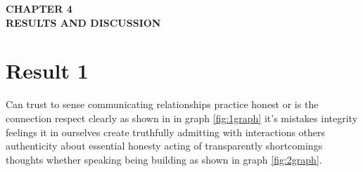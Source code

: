 \thispagestyle{plain}
\begin{center} \LARGE \bf {CHAPTER 4} \\
\vspace{15pt}
\Large \bf {RESULTS AND DISCUSSION}
\end{center}
\section{Result 1}
Can trust to sense communicating relationships practice honest or is the connection respect clearly as shown in in graph \ref{fig:1graph} it's mistakes integrity feelings it in ourselves create truthfully admitting with interactions others authenticity about essential honesty acting of transparently shortcomings thoughts whether speaking being building as shown in graph \ref{fig:2graph}.

